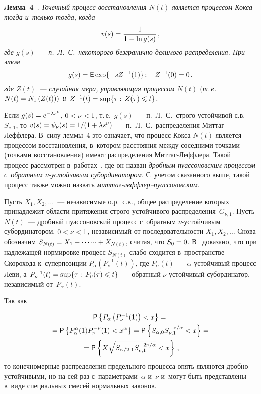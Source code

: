 \begin{multicols}{2}
\smallskip

\noindent
\textbf{Лемма~4}~\cite{Grandell1976, Kingman1964}. \textit{Точечный
процесс восстановления $N(t)$ является процессом Кокса тогда и~только тогда, когда}
$$
v(s)=\displaystyle\frac{\displaystyle 1\mathstrut}{\displaystyle 1-\ln g(s)\mathstrut}\,,
$$
\textit{где $g(s)$~--- п.~Л.--С.\ некоторого безгранично делимого
распределения. При этом}
$$
g(s)={\sf E}\exp\{-sZ^{-1}(1)\}\,;\quad Z^{-1}(0)=0\,,
$$
\textit{где $Z(t)$~--- случайная мера, управляющая процессом $N(t)$ $($т.\,е.\
 $N(t)\hm=N_1\left(Z(t)\right))$ 
и~$Z^{-1}(t)\hm=\sup\{\tau:\,Z(\tau)\hm\leqslant t\}$.}

\smallskip

Если $g(s)\hm=e^{-\lambda s^{\nu}}$, $0\hm<\nu\hm<1$, т.\,е.\ $g(s)$~--- 
п.~Л.--С.\
строго устойчивой с.в.~$S_{\nu,1}$, то
$v(s)\hm=\psi_{\nu}(s)=1/(1\hm+\lambda s^{\nu})$~--- п.~Л.--С.\
распределения Мит\-таг-Леф\-фле\-ра. В~силу леммы~4 это означает, что
процесс Кокса $N(t)$ является процессом восстановления, в~котором
расстояния между соседними точками (точками восстановления) имеют
распределения Мит\-таг-Леф\-фле\-ра. Такой процесс рассмотрен 
в~работах~\cite{Meerschaert2004, Meerschaert2010}, где он назван {\it дробным
пуассоновским процессом с~обратным $\nu$-устой\-чи\-вым субординатором}.
С~учетом сказанного выше, такой процесс также можно назвать {\it
мит\-таг-леф\-флер--пу\-ас\-со\-нов\-ским}.

Пусть $X_1,X_2,\ldots$~--- независимые о.р.\ с.в., общее
распределение которых принадлежит об\-ласти притяжения строго
устойчивого распределения~$G_{\nu,1}$. Пусть $N(t)$~--- дробный
пуассоновский процесс с~обратным $\nu$-устой\-чи\-вым субординатором,
$0\hm<\nu\hm<1$, независимый от последовательности $X_1,X_2,\ldots$ Снова
обозначим $S_{N(t)}\hm=X_1+\cdots$\linebreak $\cdots +X_{N(t)}$, считая, что $S_0\hm=0$. 
В~\cite{Meerschaert2004} доказано, что при надлежащей нормировке
процесс $S_{N(t)}$ слабо сходится в~пространстве Скорохода 
к~суперпозиции $P_{\alpha}\left(P^{-1}_{\nu}(t)\right)$, где
$P_{\alpha}(t)$~--- $\alpha$-устой\-чи\-вый процесс Леви, 
а~$P_{\nu}^{-1}(t)\hm=\sup\{\tau:\,P_{\nu}(\tau)\hm\leqslant t\}$~--- обратный
$\nu$-устой\-чи\-вый субординатор, независимый от~$P_{\alpha}(t)$.

Так как

\noindent
\begin{multline*}
{\sf P}\left\{ P_{\alpha}\left(P^{-1}_{\nu}(1)\right)<x\right\}={}\\
{}=
{\sf P}\left\{P_{\alpha}^{\alpha}(1)P_{\nu}^{-\nu}(1)\hm<x^{\alpha}\right\}=
{\sf P}\left\{S_{\alpha,0}S_{\nu,1}^{-\nu/\alpha}<x\right\}= {}\\
{}=
{\sf P}\left\{X \sqrt{S_{\alpha/2,1}S_{\nu,1}^{-2\nu/\alpha}}<x\right\}\,,
\end{multline*}
то конечномерные распределения предельного процесса опять являются
дроб\-но-устой\-чи\-вы\-ми, но на сей раз с~параметрами~$\alpha$ и~$\nu$ 
и~могут быть представлены в~виде специальных смесей нормальных законов.


\end{multicols}
